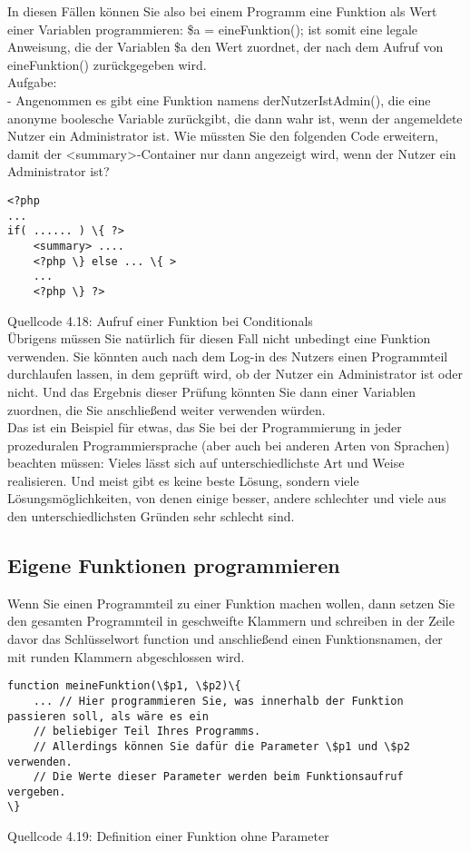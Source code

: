 In diesen Fällen können Sie also bei einem Programm eine Funktion als Wert einer Variablen programmieren: \$a = eineFunktion(); ist somit eine legale Anweisung, die der Variablen \$a den Wert zuordnet, der nach dem Aufruf von eineFunktion() zurückgegeben wird.\\

Aufgabe:\\

-	Angenommen es gibt eine Funktion namens derNutzerIstAdmin(), die eine anonyme boolesche Variable zurückgibt, die dann wahr ist, wenn der angemeldete Nutzer ein Administrator ist. Wie müssten Sie den folgenden Code erweitern, damit der <summary>-Container nur dann angezeigt wird, wenn der Nutzer ein Administrator ist?

\begin{verbatim}
<?php
...
if( ...... ) \{ ?>
	<summary> ....
	<?php \} else ... \{ >
	...
	<?php \} ?>
\end{verbatim}
Quellcode 4.18: Aufruf einer Funktion bei Conditionals\\

Übrigens müssen Sie natürlich für diesen Fall nicht unbedingt eine Funktion verwenden. Sie könnten auch nach dem Log-in des Nutzers einen Programmteil durchlaufen lassen, in dem geprüft wird, ob der Nutzer ein Administrator ist oder nicht. Und das Ergebnis dieser Prüfung könnten Sie dann einer Variablen zuordnen, die Sie anschließend weiter verwenden würden.\\

Das ist ein Beispiel für etwas, das Sie bei der Programmierung in jeder prozeduralen Programmiersprache (aber auch bei anderen Arten von Sprachen) beachten müssen: Vieles lässt sich auf unterschiedlichste Art und Weise realisieren. Und meist gibt es keine beste Lösung, sondern viele Lösungsmöglichkeiten, von denen einige besser, andere schlechter und viele aus den unterschiedlichsten Gründen sehr schlecht sind. 

\subsection{Eigene Funktionen programmieren}

Wenn Sie einen Programmteil zu einer Funktion machen wollen, dann setzen Sie den gesamten Programmteil in geschweifte Klammern und schreiben in der Zeile davor das Schlüsselwort function und anschließend einen Funktionsnamen, der mit runden Klammern abgeschlossen wird.

\begin{verbatim}
function meineFunktion(\$p1, \$p2)\{
	... // Hier programmieren Sie, was innerhalb der Funktion passieren soll, als wäre es ein
	// beliebiger Teil Ihres Programms.
	// Allerdings können Sie dafür die Parameter \$p1 und \$p2 verwenden.
	// Die Werte dieser Parameter werden beim Funktionsaufruf vergeben.
\}
\end{verbatim}
Quellcode 4.19: Definition einer Funktion ohne Parameter\\

